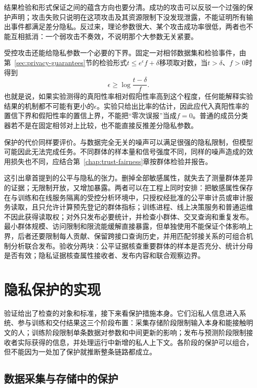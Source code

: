 结果检验和形式保证之间的蕴含方向也要分清。成功的攻击可以反驳一个过强的保护声明；攻击失败只说明在这项攻击及其资源限制下没发现泄露，不能证明所有输出事件都满足差分隐私。反过来，理论参数很大、某个攻击成功率很低，两者也不能互相抵消：一个弱攻击不奏效，不说明那个大参数无关紧要。

受控攻击还能给隐私参数一个必要的下界。固定一对相邻数据集和检验事件，由第~\ref{sec:privacy-guarantees}节的检验形式$t\leq e^\epsilon f+\delta$移项取对数，当$t>\delta$、$f>0$时得到
\[
 \epsilon\geq\log\frac{t-\delta}{f}.
\]
也就是说，如果实验测得的真阳性率相对假阳性率高到这个程度，任何能解释实验结果的机制都不可能有更小的$\epsilon$。实验只给出比率的估计，因此应代入真阳性率的置信下界和假阳性率的置信上界，不能把“零次误报”当成$f=0$。普通的成员分类器若不是在固定相邻对上比较，也不能直接反推差分隐私参数。

保护的代价同样要评价。与数据完全无关的噪声可以满足很强的隐私限制，但模型可能因此无法完成任务。不同群体的样本量和信号强度不同，同样的噪声造成的效用损失也不同，应结合第~\ref{chap:trust-fairness}章按群体检验并报告。

这引出章首提到的公平与隐私的张力。删掉全部敏感属性，就失去了测量群体差异的证据；无限制开放，又增加暴露。两者可以在工程上同时安排：把敏感属性保存在与训练和在线服务隔离的受控分析环境中，只授权经批准的公平审计员或审计服务读取，且只允许计算预先登记的群体指标；训练进程、线上决策服务和普通运维不因此获得读取权；对外只发布必要统计，并检查小群体、交叉查询和重复发布。最小群体规模、访问限制和限流能缓解直接暴露，但单独使用不能保证个体影响上界，后者还要限制每人贡献、保留跨接口查询历史，并用匹配邻接关系的可组合机制分析联合发布。验收分两块：公平证据核查重要群体的样本是否充分、统计分母是否有效；隐私证据核查属性接收者、发布内容和联合观察边界。

\section{隐私保护的实现}
\label{sec:privacy-use}

验证给出了检查的对象和标准，接下来看保护措施本身。它们沿私人信息进入系统、参与训练和交付结果这三个阶段布置：采集存储阶段限制输入本身和能接触明文的人；训练阶段限制单条数据对参数和中间更新的影响；发布与预测阶段限制接收者实际获得的信息，并处理运行中新增的私人上下文。各阶段的保护可以组合，但不能因为一处加了保护就推断整条链路都成立。

\subsection{数据采集与存储中的保护}
\label{sec:privacy-collection}

